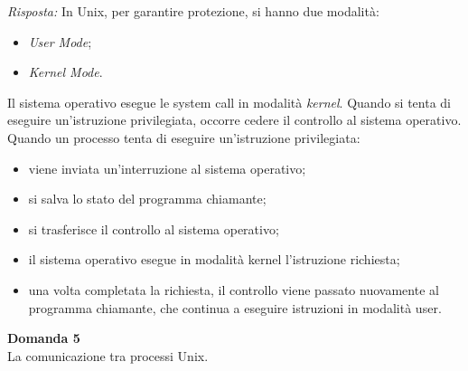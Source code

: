 \documentclass{article}
\newenvironment{problem}[2][Domanda]
    { \begin{mdframed}[backgroundcolor=gray!20] \textbf{#1 #2} \\}
    {  \end{mdframed}}
\newenvironment{solution}
    {\textit{Risposta:}}
    {}
\begin{document}
\begin{solution}
In Unix, per garantire protezione, si hanno due modalità: 
\begin{itemize}
    \item \emph{User Mode};
    \item \emph{Kernel Mode}.
\end{itemize}
Il sistema operativo esegue le system call in modalità \textit{kernel}. Quando si tenta di eseguire un’istruzione privilegiata, occorre cedere il controllo al sistema operativo.
\newline
Quando un processo tenta di eseguire un’istruzione privilegiata:
\begin{itemize}
    \item viene inviata un’interruzione al sistema operativo; 
    \item si salva lo stato del programma chiamante; 
    \item si trasferisce il controllo al sistema operativo;
    \item il sistema operativo esegue in modalità kernel l’istruzione richiesta; 
    \item una volta completata la richiesta, il controllo viene passato nuovamente al programma chiamante, che continua a eseguire istruzioni in modalità user.
\end{itemize}
\end{solution}
\begin{problem}{5}
La comunicazione tra processi Unix.
\end{problem}
\end{document}
